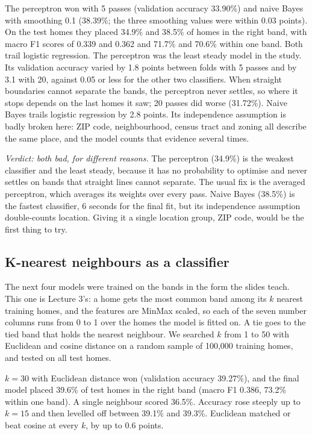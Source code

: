 \documentclass[sigconf,nonacm,10pt]{acmart}
\begin{document}
The perceptron won with 5 passes (validation accuracy 33.90\%) and naive Bayes with smoothing 0.1 (38.39\%; the three smoothing values were within 0.03 points). On the test homes they placed 34.9\% and 38.5\% of homes in the right band, with macro F1 scores of 0.339 and 0.362 and 71.7\% and 70.6\% within one band. Both trail logistic regression. The perceptron was the least steady model in the study. Its validation accuracy varied by 1.8 points between folds with 5 passes and by 3.1 with 20, against 0.05 or less for the other two classifiers. When straight boundaries cannot separate the bands, the perceptron never settles, so where it stops depends on the last homes it saw; 20 passes did worse (31.72\%). Naive Bayes trails logistic regression by 2.8 points. Its independence assumption is badly broken here: ZIP code, neighbourhood, census tract and zoning all describe the same place, and the model counts that evidence several times.

\emph{Verdict: both bad, for different reasons.} The perceptron (34.9\%) is the weakest classifier and the least steady, because it has no probability to optimise and never settles on bands that straight lines cannot separate. The usual fix is the averaged perceptron, which averages its weights over every pass. Naive Bayes (38.5\%) is the fastest classifier, 6 seconds for the final fit, but its independence assumption double-counts location. Giving it a single location group, ZIP code, would be the first thing to try.

\subsection{K-nearest neighbours as a classifier}
\label{sec:slideforms}
The next four models were trained on the bands in the form the slides teach. This one is Lecture 3's: a home gets the most common band among its $k$ nearest training homes, and the features are MinMax scaled, so each of the seven number columns runs from 0 to 1 over the homes the model is fitted on. A tie goes to the tied band that holds the nearest neighbour. We searched $k$ from 1 to 50 with Euclidean and cosine distance on a random sample of 100,000 training homes, and tested on all test homes.

$k = 30$ with Euclidean distance won (validation accuracy 39.27\%), and the final model placed 39.6\% of test homes in the right band (macro F1 0.386, 73.2\% within one band). A single neighbour scored 36.5\%. Accuracy rose steeply up to $k = 15$ and then levelled off between 39.1\% and 39.3\%. Euclidean matched or beat cosine at every $k$, by up to 0.6 points.
\end{document}
